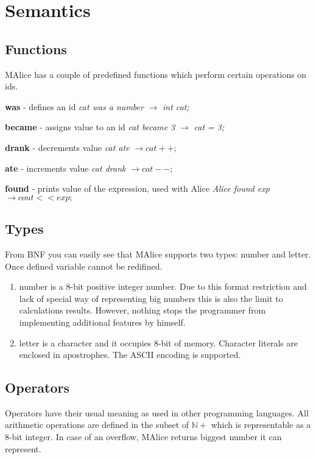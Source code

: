 \documentclass[a4wide, 11pt]{article}
\begin{document}
\section{Semantics}

\subsection{Functions}

MAlice has a couple of predefined functions which perform certain operations on ids.

\textbf{was} - defines an id
\textit{cat was a number} $\to$ \emph{int cat;}

\textbf{became} - assigns value to an id
\textit{cat became 3} $\to$ \emph{cat = 3;}


\textbf{drank} - decrements value
\textit{cat ate} $\to cat++;$


\textbf{ate} - increments value
\textit{cat drank} $\to cat--;$

\textbf{found} - prints value of the expression, used with Alice
\textit{Alice found exp} $\to cout << exp;$
\subsection{Types}

From BNF you can easily see that MAlice supports two types: number and letter. Once defined variable cannot be redifined.

\begin{enumerate}
     \item
     number is a 8-bit positive integer number. Due to this format restriction and lack of special way of representing big numbers this is also the limit to calculations results. However, nothing stops the programmer from implementing additional features by himself.  

     \item
     letter is a character and it occupies 8-bit of memory. Character literals are enclosed in apostrophes. The ASCII encoding is supported.

\end{enumerate}

\subsection{Operators}

Operators have their usual meaning as used in other programming languages. All arithmetic operations are defined in the subset of $\mathbb{N+}$ which is representable as a 8-bit integer. In case of an overflow, MAlice returns biggest number it can represent.
\end{document}
